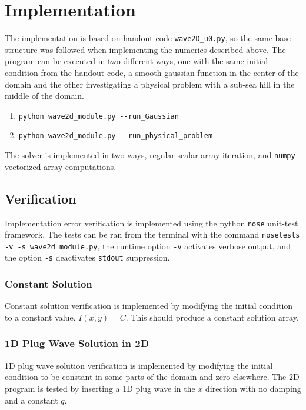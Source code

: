 \documentclass[11pt]{article}
\begin{document}
	\section{Implementation}
	The implementation is based on handout code \verb|wave2D_u0.py|, so the same 
	base structure was followed when implementing the numerics described above.
	The program can be executed in two different ways, one with the same
	initial condition from the handout code, a smooth gaussian function in the
	center of the domain and the other investigating a physical problem with
	a sub-sea hill in the middle of the domain.
	\begin{enumerate}
	\item[] \verb|python wave2d_module.py --run_Gaussian|
	\item[] \verb|python wave2d_module.py --run_physical_problem|
	\end{enumerate}
	The solver is implemented in two ways, regular scalar array iteration,
	and \verb|numpy| vectorized array computations.
	\subsection{Verification}
	Implementation error verification is implemented using the python \verb|nose|
	unit-test framework. The tests can be ran from the terminal with the command 
	\verb|nosetests -v -s wave2d_module.py|, the runtime option \verb|-v| activates
	verbose output, and the option \verb|-s| deactivates \verb|stdout| suppression.
	\subsubsection*{Constant Solution}
	Constant solution verification is implemented by modifying the initial 
	condition to a constant value, $I(x,y)=C$. This should produce a constant 
	solution array.
	\subsubsection*{1D Plug Wave Solution in 2D}
	1D plug wave solution verification is implemented by modifying the initial 
	condition to be constant in some parts of the domain and zero elsewhere. 
 	The 2D program is tested by inserting a 1D plug wave in the $x$ direction with
 	no damping and a constant $q$.
	
\end{document}
